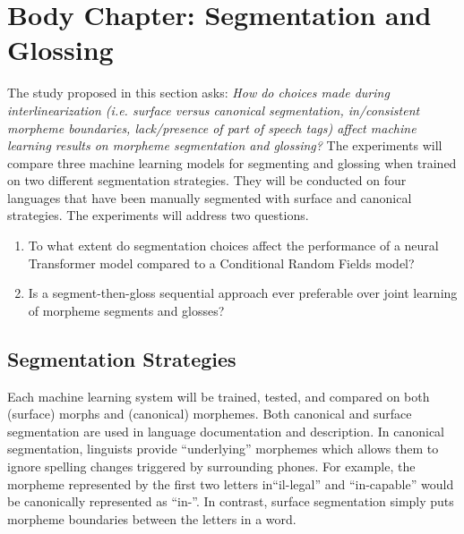 \section{Body Chapter: Segmentation and Glossing}
\label{sec:seggls}

The study proposed in this section asks: \emph{How do choices made during interlinearization (i.e. surface versus canonical segmentation, in/consistent morpheme boundaries, lack/presence of part of speech tags) affect machine learning results on morpheme segmentation and glossing?} The experiments will compare three machine learning models for segmenting and glossing when trained on two different segmentation strategies. They will be conducted on four languages that have been manually segmented with surface and canonical strategies. 
The experiments will address two questions.

\begin{enumerate}
    \item To what extent do segmentation choices affect the performance of a neural Transformer model compared to a Conditional Random Fields model? 
    \item Is a segment-then-gloss sequential approach ever preferable over joint learning of morpheme segments and glosses?
\end{enumerate}
    
\subsection{Segmentation Strategies}    
Each machine learning system will be trained, tested, and compared on both (surface) morphs and (canonical) morphemes. Both canonical and surface segmentation are used in language documentation and description. In canonical segmentation, linguists provide ``underlying'' morphemes which allows them to ignore spelling changes triggered by surrounding phones. For example, the morpheme represented by the first two letters in``il-legal'' and ``in-capable'' would be canonically represented as ``in-''. In contrast, surface segmentation simply puts morpheme boundaries between the letters in a word. 

